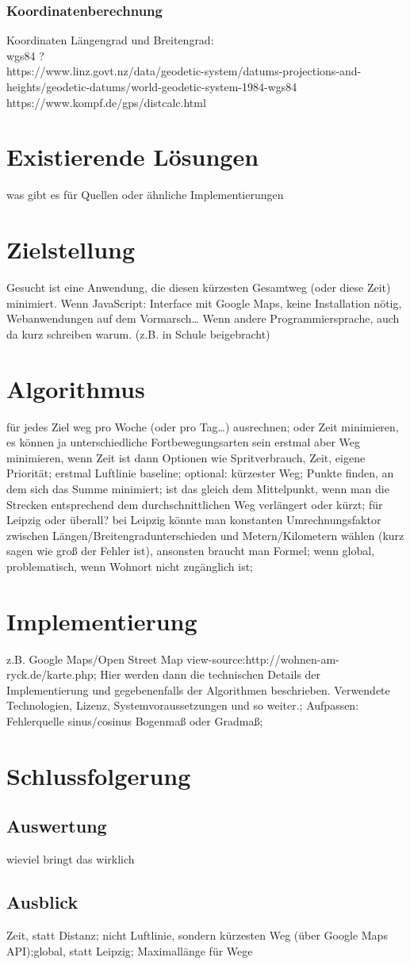 \documentclass[a4paper, twoside, 12pt]{scrreprt}
\begin{document}
\subsection{Koordinatenberechnung}
Koordinaten Längengrad und Breitengrad:\\ wgs84 ? \\
https://www.linz.govt.nz/data/geodetic-system/datums-projections-and-heights/geodetic-datums/world-geodetic-system-1984-wgs84 \\
https://www.kompf.de/gps/distcalc.html
\chapter{Existierende Lösungen}
was gibt es für Quellen oder ähnliche Implementierungen
\chapter{Zielstellung}
Gesucht ist eine Anwendung, die diesen kürzesten Gesamtweg (oder diese Zeit) minimiert.
Wenn JavaScript: Interface mit Google Maps, keine Installation nötig, Webanwendungen auf dem Vormarsch…
Wenn andere Programmiersprache, auch da kurz schreiben warum.
(z.B. in Schule beigebracht)
\chapter{Algorithmus}
für jedes Ziel weg pro Woche (oder pro Tag…) ausrechnen;
oder Zeit minimieren, es können ja unterschiedliche Fortbewegungsarten sein
erstmal aber Weg minimieren, wenn Zeit ist dann Optionen wie Spritverbrauch, Zeit, eigene Priorität;
erstmal Luftlinie baseline;
optional: kürzester Weg;
Punkte finden, an dem sich das Summe minimiert;
ist das gleich dem Mittelpunkt, wenn man die Strecken entsprechend dem durchschnittlichen Weg verlängert oder kürzt;
für Leipzig oder überall? bei Leipzig könnte man konstanten Umrechnungsfaktor zwischen Längen/Breitengradunterschieden und Metern/Kilometern wählen (kurz sagen wie groß der Fehler ist), ansonsten braucht man Formel;
wenn global, problematisch, wenn Wohnort nicht zugänglich ist;
\chapter{Implementierung}
z.B. Google Maps/Open Street Map view-source:http://wohnen-am-ryck.de/karte.php;
Hier werden dann die technischen Details der Implementierung und gegebenenfalls der Algorithmen beschrieben.
Verwendete Technologien, Lizenz, Systemvoraussetzungen und so weiter.;
Aufpassen: Fehlerquelle sinus/cosinus Bogenmaß oder Gradmaß;
\chapter{Schlussfolgerung}
\section{Auswertung}
wieviel bringt das wirklich
\section{Ausblick}
Zeit, statt Distanz; nicht Luftlinie, sondern kürzesten Weg (über Google Maps API);global, statt Leipzig; Maximallänge für Wege
{}

\end{document}
